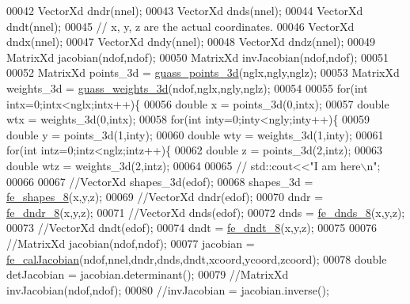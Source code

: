 \begin{DoxyCode}
00042     VectorXd dndr(nnel);
00043     VectorXd dnds(nnel);
00044     VectorXd dndt(nnel);
00045     \textcolor{comment}{// x, y, z are the actual coordinates.}
00046     VectorXd dndx(nnel);
00047     VectorXd dndy(nnel);
00048     VectorXd dndz(nnel);
00049     MatrixXd jacobian(ndof,ndof);
00050     MatrixXd invJacobian(ndof,ndof);
00051 
00052     MatrixXd points\_3d = \hyperlink{functions_8h_a502e3469e1cc253deb142f46c0789a78}{guass\_points\_3d}(nglx,ngly,nglz);
00053     MatrixXd weights\_3d = \hyperlink{functions_8h_ad99b08ce65ae353e91486d7685c22024}{guass\_weights\_3d}(ndof,nglx,ngly,nglz);
00054 
00055     \textcolor{keywordflow}{for}(\textcolor{keywordtype}{int} intx=0;intx<nglx;intx++)\{
00056         \textcolor{keywordtype}{double} x = points\_3d(0,intx);
00057         \textcolor{keywordtype}{double} wtx = weights\_3d(0,intx);
00058         \textcolor{keywordflow}{for}(\textcolor{keywordtype}{int} inty=0;inty<ngly;inty++)\{
00059             \textcolor{keywordtype}{double} y = points\_3d(1,inty);
00060             \textcolor{keywordtype}{double} wty = weights\_3d(1,inty);
00061             \textcolor{keywordflow}{for}(\textcolor{keywordtype}{int} intz=0;intz<nglz;intz++)\{
00062                 \textcolor{keywordtype}{double} z = points\_3d(2,intz);
00063                 \textcolor{keywordtype}{double} wtz = weights\_3d(2,intz);
00064 
00065                 \textcolor{comment}{// std::cout<<"I am here\(\backslash\)n";}
00066 
00067                 \textcolor{comment}{//VectorXd shapes\_3d(edof);}
00068                 shapes\_3d = \hyperlink{functions_8h_ab77a3a6d6f6b436d7e8c600bb0869927}{fe\_shapes\_8}(x,y,z);
00069                 \textcolor{comment}{//VectorXd dndr(edof);}
00070                 dndr = \hyperlink{functions_8h_afc547bef246c057db6cbd04bf7f866a9}{fe\_dndr\_8}(x,y,z);
00071                 \textcolor{comment}{//VectorXd dnds(edof);}
00072                 dnds = \hyperlink{functions_8h_ac0b5524525e1f2e89bb064c15ab8e664}{fe\_dnds\_8}(x,y,z);
00073                 \textcolor{comment}{//VectorXd dndt(edof);}
00074                 dndt = \hyperlink{functions_8h_a57e8e5c9f740c98e4767f29c121c2d0a}{fe\_dndt\_8}(x,y,z);
00075 
00076                 \textcolor{comment}{//MatrixXd jacobian(ndof,ndof);}
00077                 jacobian = \hyperlink{functions_8h_a5ae3771e65b4a0d177097041a4349c28}{fe\_calJacobian}(ndof,nnel,dndr,dnds,dndt,xcoord,ycoord,zcoord);
00078                 \textcolor{keywordtype}{double} detJacobian = jacobian.determinant();
00079                 \textcolor{comment}{//MatrixXd invJacobian(ndof,ndof);}
00080                 \textcolor{comment}{//invJacobian = jacobian.inverse();}

\end{DoxyCode}
